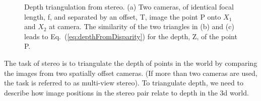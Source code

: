 \begin{figure}
\centerline{
}
\centerline{
}
\caption{Depth triangulation from stereo. (a) Two cameras, of identical focal length, f, and separated by an offset, T, image the point P onto $X_1$ and $X_2$ at camera.  The similarity of the two triangles in (b) and (c) leads to Eq.~(\ref{eq:depthFromDisparity}) for the depth, Z, of the point P.}
\label{fig:stereo}
\end{figure}

The task of stereo is to triangulate the depth of points in the world by comparing the images from two spatially offset cameras.  (If more than two cameras are used, the task is referred to as multi-view stereo).  To triangulate depth, we need to describe how image positions in the stereo pair relate to depth in the 3d world. 


